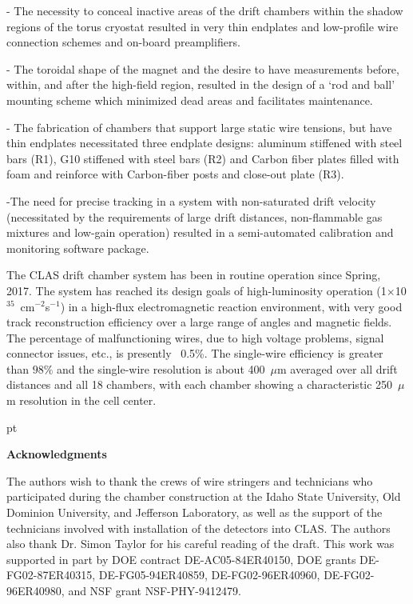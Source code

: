 \vskip 10pt
\noindent
- The necessity to conceal inactive areas of the drift chambers within the
shadow regions of the torus cryostat resulted in very thin endplates and low-profile
wire connection schemes and on-board preamplifiers.

\noindent
- The toroidal shape of the magnet and the desire to have measurements before, within, 
and after the high-field region, resulted in the design of a `rod and ball' mounting scheme
which minimized dead areas and facilitates maintenance.

\noindent
- The fabrication of chambers that support large static wire tensions, but have thin 
endplates necessitated three endplate designs: aluminum stiffened with steel bars (R1),
G10 stiffened with steel bars (R2) and Carbon fiber plates filled with foam and reinforce
with Carbon-fiber posts and close-out plate (R3). 

\noindent
-The need for precise tracking in a system with non-saturated drift velocity 
(necessitated by the requirements of large drift distances, non-flammable gas mixtures 
and low-gain operation) resulted in a semi-automated calibration and monitoring software 
package.

\vskip 10pt
The CLAS drift chamber system has been in routine operation since Spring, 2017. 
The system has reached its design goals of 
high-luminosity operation (1$\times$10$^{35}$~cm$^{-2}$s$^{-1}$) in a 
high-flux electromagnetic reaction environment, with very good track 
reconstruction efficiency over a large range of angles and 
magnetic fields.  
The percentage of malfunctioning wires, due to high voltage problems, signal
connector issues, etc., is presently ~0.5\%.
The single-wire efficiency is greater than $98\%$ and the
single-wire resolution is about 400~$\mu$m averaged over all drift distances and
all 18 chambers, with each chamber showing a characteristic 250~$\mu$m resolution 
in the cell center.

 pt

{\large{\bf Acknowledgments}}

\vskip 10pt

The authors wish to thank the crews of wire stringers and technicians who 
participated during the chamber construction at the Idaho State University,
Old Dominion University, and Jefferson Laboratory, as well as the support of 
the technicians involved with installation of the detectors into CLAS.  The
authors also thank Dr. Simon Taylor for his careful reading of the draft.  This
work was supported in part by DOE contract DE-AC05-84ER40150, DOE grants 
DE-FG02-87ER40315, DE-FG05-94ER40859, DE-FG02-96ER40960, DE-FG02-96ER40980, 
and NSF grant NSF-PHY-9412479.




